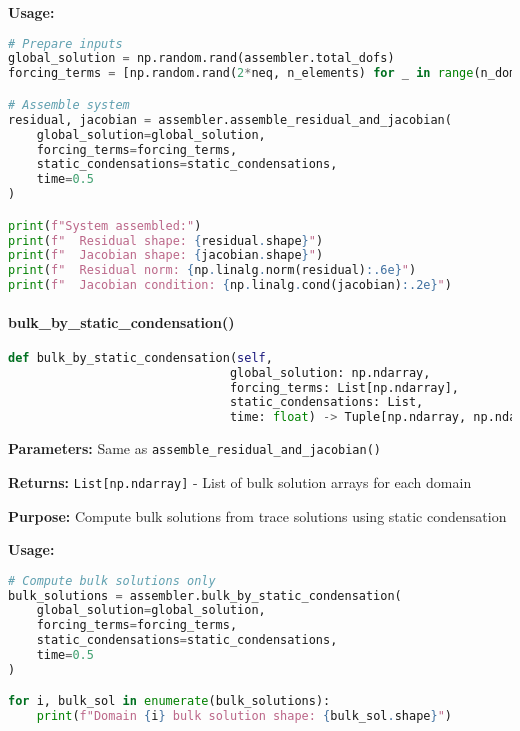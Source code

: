 \textbf{Usage:}
\begin{lstlisting}[language=Python, caption=Residual and Jacobian Assembly Usage]
# Prepare inputs
global_solution = np.random.rand(assembler.total_dofs)
forcing_terms = [np.random.rand(2*neq, n_elements) for _ in range(n_domains)]

# Assemble system
residual, jacobian = assembler.assemble_residual_and_jacobian(
    global_solution=global_solution,
    forcing_terms=forcing_terms,
    static_condensations=static_condensations,
    time=0.5
)

print(f"System assembled:")
print(f"  Residual shape: {residual.shape}")
print(f"  Jacobian shape: {jacobian.shape}")
print(f"  Residual norm: {np.linalg.norm(residual):.6e}")
print(f"  Jacobian condition: {np.linalg.cond(jacobian):.2e}")
\end{lstlisting}

\paragraph{bulk\_by\_static\_condensation()}
\leavevmode
\begin{lstlisting}[language=Python, caption=Bulk by Static Condensation Method]
def bulk_by_static_condensation(self, 
                               global_solution: np.ndarray,
                               forcing_terms: List[np.ndarray],
                               static_condensations: List,
                               time: float) -> Tuple[np.ndarray, np.ndarray]
\end{lstlisting}

\textbf{Parameters:} Same as \texttt{assemble\_residual\_and\_jacobian()}

\textbf{Returns:} \texttt{List[np.ndarray]} - List of bulk solution arrays for each domain

\textbf{Purpose:} Compute bulk solutions from trace solutions using static condensation

\textbf{Usage:}
\begin{lstlisting}[language=Python, caption=Bulk Solution Computation Usage]
# Compute bulk solutions only
bulk_solutions = assembler.bulk_by_static_condensation(
    global_solution=global_solution,
    forcing_terms=forcing_terms,
    static_condensations=static_condensations,
    time=0.5
)

for i, bulk_sol in enumerate(bulk_solutions):
    print(f"Domain {i} bulk solution shape: {bulk_sol.shape}")
\end{lstlisting}

